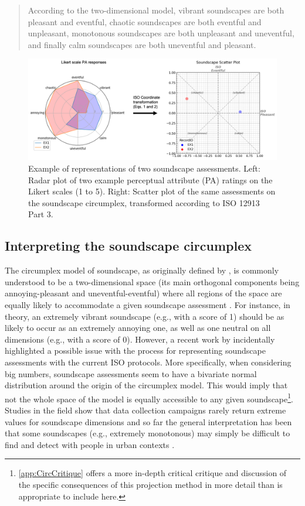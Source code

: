 \begin{quote}
  According to the two-dimensional model, vibrant soundscapes are both pleasant and eventful, chaotic soundscapes are both eventful and unpleasant, monotonous soundscapes are both unpleasant and uneventful, and finally calm soundscapes are both uneventful and pleasant.
\end{quote}

\begin{figure}
  \includegraphics[width=\textwidth]{Figures/jasa-el_Figure1.png}
  \caption{Example of representations of two soundscape assessments. Left: Radar plot of two example perceptual attribute (PA) ratings on the Likert scales (1 to 5). Right: Scatter plot of the same assessments on the soundscape circumplex, transformed according to ISO 12913 Part 3.
    \label{fig:radar}
  }
\end{figure}

\subsection{Interpreting the soundscape circumplex}
The circumplex model of soundscape, as originally defined by \citet{Axelsson2010principal}, is commonly understood to be a two-dimensional space (its main orthogonal components being annoying-pleasant and uneventful-eventful) where all regions of the space are equally likely to accommodate a given soundscape assessment \citep{Aletta2016Soundscape}. For instance, in theory, an extremely vibrant soundscape (e.g., with a score of 1) should be as likely to occur as an extremely annoying one, as well as one neutral on all dimensions (e.g., with a score of 0). However, a recent work by \citet{Lionello2021Introducing} incidentally highlighted a possible issue with the process for representing soundscape assessments with the current ISO protocols. More specifically, when considering big numbers, soundscape assessments seem to have a bivariate normal distribution around the origin of the circumplex model. This would imply that not the whole space of the model is equally accessible to any given soundscape\footnote{\cref{app:CircCritique} offers a more in-depth critical critique and discussion of the specific consequences of this projection method in more detail than is appropriate to include here.}. Studies in the field show that data collection campaigns rarely return extreme values for soundscape dimensions \citep{Mancini2021Soundwalk} and so far the general interpretation has been that some soundscapes (e.g., extremely monotonous) may simply be difficult to find and detect with people in urban contexts \citep{Sun2019Classification}.

